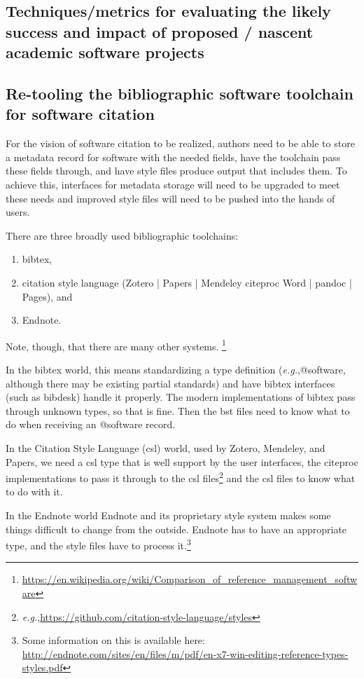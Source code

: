 \documentclass[a4paper,UKenglish]{dagman}
\newcommand{\eg}{\emph{e.g.},\xspace}
\begin{document}
\subsection{Techniques/metrics for evaluating the likely success and impact of proposed / nascent academic software projects}

\subsection{Re-tooling the bibliographic software toolchain for software citation}

For the vision of software citation to be realized, authors need to be able to store a metadata record for software with the needed fields, have the toolchain pass these fields through, and have style files produce output that includes them. To achieve this, interfaces for metadata storage will need to be upgraded to meet these needs and improved style files will need to be pushed into the hands of users.

There are three broadly used bibliographic toolchains:
\begin{enumerate}
\item bibtex, 
\item citation style language (Zotero | Papers | Mendeley \ra citeproc \ra Word | pandoc | Pages),  and \item Endnote.
\end{enumerate}
Note, though, that there are many other systems.%
\footnote{\url{https://en.wikipedia.org/wiki/Comparison_of_reference_management_software}}

In the bibtex world, this means standardizing a type definition (\eg @software, although there may be existing partial standards) and have bibtex interfaces (such as bibdesk) handle it properly. The modern implementations of bibtex pass through unknown types, so that is fine. Then the bst files need to know what to do when receiving an @software record.

In the Citation Style Language (csl) world, used by Zotero, Mendeley, and Papers, we need a csl type that is well support by the user interfaces, the citeproc implementations to pass it through to the csl files\footnote{\eg \url{https://github.com/citation-style-language/styles}} and the csl files to know what to do with it.

In the Endnote world Endnote and its proprietary style system makes some things difficult to change from the outside. Endnote has to have an appropriate type, and the style files have to process it.\footnote{Some information on this is available here:\\ \url{http://endnote.com/sites/en/files/m/pdf/en-x7-win-editing-reference-types-styles.pdf}}
\end{document}
